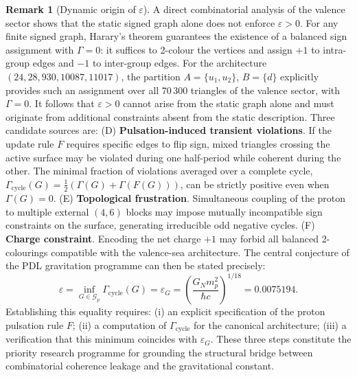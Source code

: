 \documentclass[11pt,a4paper]{article}
\theoremstyle{definition}
\newtheorem{remark}[theorem]{Remark}
\begin{document}
\begin{remark}[Dynamic origin of $\varepsilon$]
\label{rem:dynamic_origin}
A direct combinatorial analysis of the valence sector shows that the static signed graph alone does not enforce $\varepsilon > 0$. For any finite signed graph, Harary's theorem guarantees the existence of a balanced sign assignment with $\Gamma = 0$: it suffices to 2-colour the vertices and assign $+1$ to intra-group edges and $-1$ to inter-group edges. For the architecture $(24, 28, 930, 10087, 11017)$, the partition $A = \{u_1, u_2\}$, $B = \{d\}$ explicitly provides such an assignment over all 70\,300 triangles of the valence sector, with $\Gamma = 0$. It follows that $\varepsilon > 0$ cannot arise from the static graph alone and must originate from additional constraints absent from the static description. Three candidate sources are: (D) \textbf{Pulsation-induced transient violations}. If the update rule $F$ requires specific edges to flip sign, mixed triangles crossing the active surface may be violated during one half-period while coherent during the other. The minimal fraction of violations averaged over a complete cycle, $\Gamma_{\mathrm{cycle}}(G) = \frac{1}{2}(\Gamma(G) + \Gamma(F(G)))$, can be strictly positive even when $\Gamma(G) = 0$. (E) \textbf{Topological frustration}. Simultaneous coupling of the proton to multiple external $(4,6)$ blocks may impose mutually incompatible sign constraints on the surface, generating irreducible odd negative cycles. (F) \textbf{Charge constraint}. Encoding the net charge $+1$ may forbid all balanced 2-colourings compatible with the valence-sea architecture. The central conjecture of the PDL gravitation programme can then be stated precisely: \begin{equation} \varepsilon = \inf_{G \in \mathcal{G}_p} \Gamma_{\mathrm{cycle}}(G) = \varepsilon_G = \left(\frac{G_N m_p^2}{\hbar c}\right)^{1/18} = 0.0075194. \label{eq:central_conjecture} \end{equation} Establishing this equality requires: (i) an explicit specification of the proton pulsation rule $F$; (ii) a computation of $\Gamma_{\mathrm{cycle}}$ for the canonical architecture; (iii) a verification that this minimum coincides with $\varepsilon_G$. These three steps constitute the priority research programme for grounding the structural bridge between combinatorial coherence leakage and the gravitational constant.
\end{remark}
\end{document}
